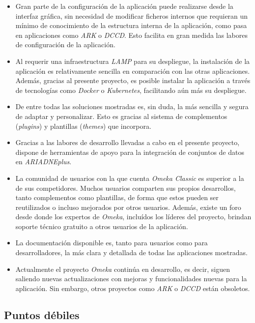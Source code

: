 \begin{itemize}
\tightlist
\item
  Gran parte de la configuración de la aplicación puede realizarse desde
  la interfaz gráfica, sin necesidad de modificar ficheros internos que
  requieran un mínimo de conocimiento de la estructura interna de la
  aplicación, como pasa en aplicaciones como \emph{ARK} o \emph{DCCD}.
  Esto facilita en gran medida las labores de configuración de la
  aplicación.
\item
  Al requerir una infraestructura \emph{LAMP} para su despliegue, la
  instalación de la aplicación es relativamente sencilla en comparación
  con las otras aplicaciones. Además, gracias al presente proyecto, es
  posible instalar la aplicación a través de tecnologías como
  \emph{Docker} o \emph{Kubernetes}, facilitando aún más su despliegue.
\item
  De entre todas las soluciones mostradas es, sin duda, la más sencilla
  y segura de adaptar y personalizar. Esto es gracias al sistema de
  complementos (\emph{plugins}) y plantillas (\emph{themes}) que
  incorpora.
\item
  Gracias a las labores de desarrollo llevadas a cabo en el presente
  proyecto, dispone de herramientas de apoyo para la integración de
  conjuntos de datos en \emph{ARIADNEplus}.
\item
  La comunidad de usuarios con la que cuenta \emph{Omeka Classic} es
  superior a la de sus competidores. Muchos usuarios comparten sus
  propios desarrollos, tanto complementos como plantillas, de forma que
  estos pueden ser reutilizados o incluso mejorados por otros usuarios.
  Además, existe un foro desde donde los expertos de \emph{Omeka},
  incluídos los líderes del proyecto, brindan soporte técnico gratuito a
  otros usuarios de la aplicación.
\item
  La documentación disponible es, tanto para usuarios como para
  desarrolladores, la más clara y detallada de todas las aplicaciones
  mostradas.
\item
  Actualmente el proyecto \emph{Omeka} continúa en desarrollo, es decir,
  siguen saliendo nuevas actualizaciones con mejoras y funcionalidades
  nuevas para la aplicación. Sin embargo, otros proyectos como
  \emph{ARK} o \emph{DCCD} están obsoletos.
\end{itemize}


\subsection{Puntos débiles}

